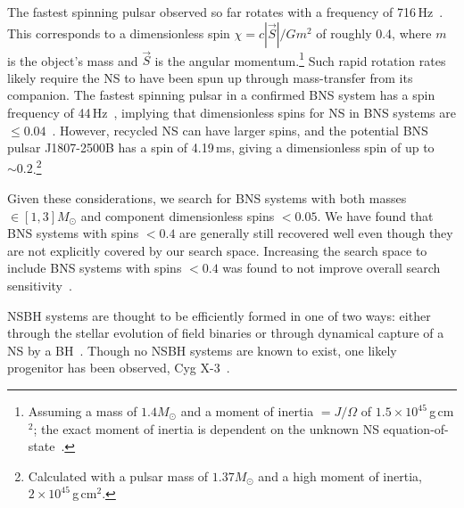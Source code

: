 The fastest spinning pulsar observed so far rotates with a frequency of 716\,Hz~\citep{Hessels:2006ze}. This
corresponds to a dimensionless spin $\chi = c | \vec{S} | / G m^2$ of roughly 0.4, where $m$ is the object's
mass and  $\vec{S}$ is the angular momentum.\footnote{Assuming a mass of $1.4{{M_\odot}}$ and
a moment of inertia $=J/\Omega$ of $1.5\times10^{45}$\,g\,cm$^2$; the exact moment of
inertia is dependent on the unknown \ac{NS} equation-of-state~\citep{Lattimer:2012nd}.} Such
rapid rotation rates likely require the NS to have been spun up through mass-transfer
from its companion. The fastest spinning pulsar in a confirmed \ac{BNS} system has a
spin frequency of 44\,Hz~\citep{Kramer:2009zza}, implying that dimensionless
spins for NS in \ac{BNS} systems are $\leq 0.04$~\citep{Brown:2012qf}. However,
recycled NS can have larger spins, and the potential \ac{BNS} pulsar J1807-2500B
\citep{Lynch:2011aa} has
a spin of 4.19\,ms, giving a dimensionless spin of up to
$\sim0.2$.\footnote{Calculated with a pulsar mass of $1.37{{M_\odot}}$ and a
high moment of inertia, $2\times10^{45}$\,g\,cm$^2$.}

Given these considerations, we search for \ac{BNS} systems with both masses
$\in [1,3] M_{\odot}$ and component dimensionless spins $< 0.05$. We have found
that \ac{BNS} systems with spins $< 0.4$ are generally still recovered well even
though they are not explicitly covered by our search space. Increasing the
search space to include \ac{BNS} systems with spins $< 0.4$ was found to
not improve overall search sensitivity~\citep{nitzthesis}.

\ac{NSBH} systems are thought to be efficiently formed in one of two ways: either
through the stellar evolution of field binaries or through dynamical
capture of a \ac{NS} by a \ac{BH}~\citep{Grindlay:2005ym,Sadowski:2007dz,Lee:2009ca,Benacquista:2011kv}.
Though no \ac{NSBH} systems are known to
exist, one likely progenitor has been observed, Cyg
X-3~\citep{Belczynski:2012jc}.

